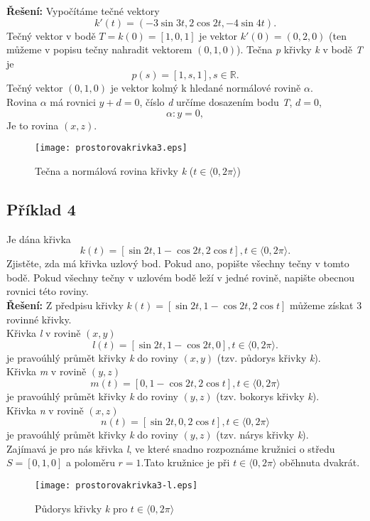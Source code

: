 \textbf{Řešení:} Vypočítáme tečné vektory
$$k'(t)=(-3\sin{3t}, 2\cos{2t}, -4\sin{4t}).$$
Tečný vektor v bodě $T=k(0)=[1,0,1]$ je vektor $k'(0)=(0,2,0)$ (ten můžeme v popisu tečny nahradit vektorem $(0,1,0)$).
Tečna \textit{p} křivky \textit{k} v bodě \textit{T} je
$$p(s)=[1,s,1], s \in \mathbb{R}.$$
Tečný vektor $(0,1,0)$ je vektor kolmý k hledané normálové rovině $\alpha$. \\
Rovina $\alpha$ má rovnici $y+d=0$, číslo \textit{d} určíme dosazením bodu \textit{T}, $d=0$, 
$$\alpha: y=0,$$
Je to rovina $(x, z)$.
\begin{figure}[ht!]
	\centering
	\texttt{[image: prostorovakrivka3.eps]}
	\caption{Tečna a normálová rovina křivky \textit{k} ($t \in \langle0, 2\pi\rangle$)}
	\label{overflow}
\end{figure}
\clearpage
\subsection*{Příklad 4}
Je dána křivka
$$k(t) = [\sin{2t}, 1 - \cos{2t}, 2\cos{t}], t \in \langle0, 2\pi\rangle.$$
Zjistěte, zda má křivka uzlový bod. Pokud ano, popište všechny tečny v tomto bodě.
Pokud všechny tečny v uzlovém bodě leží v jedné rovině, napište obecnou rovnici této roviny. \\[10pt]
\textbf{Řešení:} Z předpisu křivky $k(t) = [\sin{2t}, 1 - \cos{2t}, 2\cos{t}]$ můžeme získat 3 rovinné křivky. \\
Křivka \textit{l} v rovině $(x, y)$
$$l(t) = [\sin{2t}, 1 - \cos{2t}, 0], t \in \langle0, 2\pi\rangle.$$
je pravoúhlý průmět křivky \textit{k} do roviny $(x,y)$ (tzv. půdorys křivky \textit{k}). \\
Křivka \textit{m} v rovině $(y, z)$
$$m(t) = [0, 1 - \cos{2t}, 2\cos{t}], t \in \langle0, 2\pi\rangle$$
je pravoúhlý průmět křivky \textit{k} do roviny $(y,z)$ (tzv. bokorys křivky \textit{k}). \\
Křivka \textit{n} v rovině $(x, z)$
$$n(t) = [\sin{2t}, 0, 2\cos{t}], t \in \langle0, 2\pi\rangle$$
je pravoúhlý průmět křivky \textit{k} do roviny $(y,z)$ (tzv. nárys křivky \textit{k}). \\
Zajímavá je pro nás křivka \textit{l}, ve které snadno rozpoznáme kružnici o středu $S=[0,1,0]$
a poloměru $r=1$.Tato kružnice je při $t \in \langle0, 2\pi\rangle$ oběhnuta dvakrát. \\
\begin{figure}[H]
	\centering
	\texttt{[image: prostorovakrivka3-l.eps]}
	\caption{Půdorys křivky \textit{k} pro $t \in \langle0, 2\pi\rangle$}
	\label{overflow}
\end{figure}
